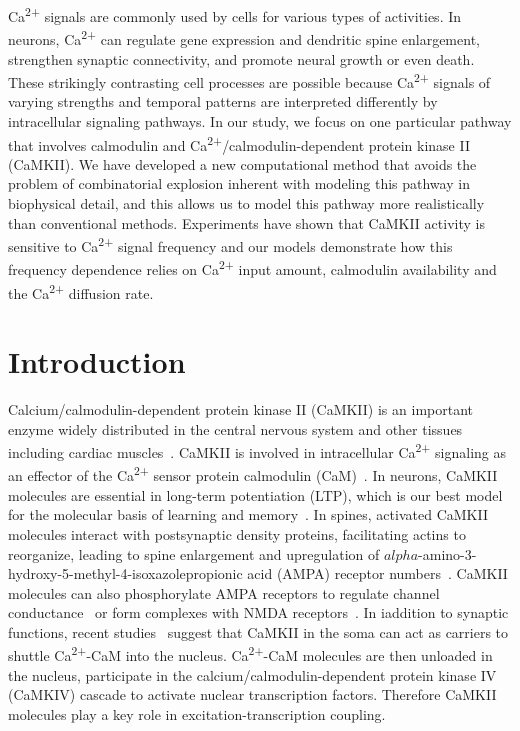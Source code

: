 \documentclass[10pt,letterpaper]{article}
\begin{document}
Ca\textsuperscript{2+} signals are commonly used by cells for various types of activities. In neurons, Ca\textsuperscript{2+} can regulate gene expression and dendritic spine enlargement, strengthen synaptic connectivity, and promote neural growth or even death. These strikingly contrasting cell processes are possible because Ca\textsuperscript{2+} signals of varying strengths and temporal patterns are interpreted differently by intracellular signaling pathways. In our study, we focus on one particular pathway that involves calmodulin and Ca\textsuperscript{2+}/calmodulin-dependent protein kinase II (CaMKII). We have developed a new computational method that avoids the problem of combinatorial explosion inherent with modeling this pathway in biophysical detail, and this allows us to model this pathway more realistically than conventional methods. Experiments have shown that CaMKII activity is sensitive to Ca\textsuperscript{2+} signal frequency and our models demonstrate how this frequency dependence relies on Ca\textsuperscript{2+} input amount, calmodulin availability and the Ca\textsuperscript{2+} diffusion rate.

\linenumbers
\section*{Introduction}
Calcium/calmodulin-dependent protein kinase II (CaMKII) is an important enzyme widely distributed in the central nervous system and other tissues including cardiac muscles~\cite{Wayman:2008gla,Lisman:2002ki,Erickson:2014fs}. CaMKII is involved in intracellular Ca\textsuperscript{2+} signaling as an effector of the Ca\textsuperscript{2+} sensor protein calmodulin (CaM)~\cite{Herring:2016bh,Hell:2014bd,Coultrap:2012ip}. In neurons, CaMKII molecules are essential in long-term potentiation (LTP), which is our best model for the molecular basis of learning and memory~\cite{Bliss:1973jg}. In spines, activated CaMKII molecules interact with postsynaptic density proteins, facilitating actins to reorganize, leading to spine enlargement and upregulation of $alpha$-amino-3-hydroxy-5-methyl-4-isoxazolepropionic acid (AMPA) receptor numbers~\cite{Herring:2016bh}. CaMKII molecules can also phosphorylate AMPA receptors to regulate channel conductance~\cite{Herring:2016bh,Coultrap:2012ip} or form complexes with NMDA receptors~\cite{Hell:2014bd}. In iaddition to synaptic functions, recent studies~\cite{Ma:2014dr,Li:2016cq} suggest that CaMKII in the soma can act as carriers to shuttle Ca\textsuperscript{2+}-CaM into the nucleus. Ca\textsuperscript{2+}-CaM molecules are then unloaded in the nucleus, participate in the calcium/calmodulin-dependent protein kinase IV (CaMKIV) cascade to activate nuclear transcription factors. Therefore CaMKII molecules play a key role in excitation-transcription coupling. 
\end{document}
